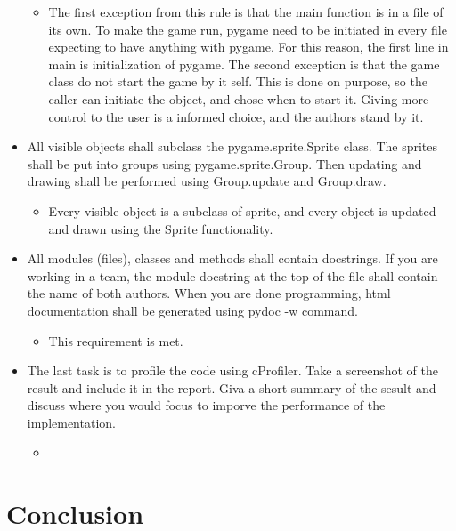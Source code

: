 \documentclass{article}
\begin{document}
\begin{itemize}
	\begin{itemize}
		\item The first exception from this rule is that the main function is in a file of its own. To make the game run, pygame need to be initiated in every file expecting to have anything with pygame. For this reason, the first line in main is initialization of pygame. The second exception is that the game class do not start the game by it self. This is done on purpose, so the caller can initiate the object, and chose when to start it. Giving more control to the user is a informed choice, and the authors stand by it.
	\end{itemize}
	\item All visible objects shall subclass the pygame.sprite.Sprite class. The sprites shall be put into groups using pygame.sprite.Group. Then updating and drawing shall be performed using Group.update and Group.draw. 
	\begin{itemize}
		\item Every visible object is a subclass of sprite, and every object is updated and drawn using the Sprite functionality.
	\end{itemize}
	\item All modules (files), classes and methods shall contain docstrings. If you are working in a team, the module docstring at the top of the file shall contain the name of both authors. When you are done programming, html documentation shall be generated using pydoc -w command.
	\begin{itemize}
		\item This requirement is met.
	\end{itemize}
	\item The last task is to profile the code using cProfiler. Take a screenshot of the result and include it in the report. Giva a short summary of the sesult and discuss where you would focus to imporve the performance of the implementation.
	\begin{itemize}
		\item 
	\end{itemize}
\end{itemize}

\section{Conclusion}
\paragraph{}
\end{document}
